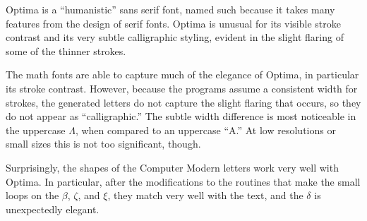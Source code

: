 
Optima is a ``humanistic'' sans serif font, named such because it takes many
features from the design of serif fonts. Optima is unusual for its visible
stroke contrast and its very subtle calligraphic styling, evident in the slight
flaring of some of the thinner strokes.

The math fonts are able to capture much of the elegance of Optima, in particular
its stroke contrast. However, because the programs assume a consistent width for
strokes, the generated letters do not capture the slight flaring that occurs, so
they do not appear as ``calligraphic.'' The subtle width difference is most
noticeable in the uppercase $\Lambda$, when compared to an uppercase ``A.'' At
low resolutions or small sizes this is not too significant, though.

Surprisingly, the shapes of the Computer Modern letters work very well with
Optima. In particular, after the modifications to the routines that make the
small loops on the $\beta$, $\zeta$, and $\xi$, they match very well with the
text, and the $\delta$ is unexpectedly elegant.
